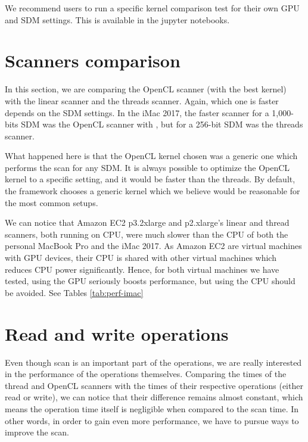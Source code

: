 We recommend users to run a specific kernel comparison test for their own GPU and SDM settings.  This is available in the jupyter notebooks.


\section{Scanners comparison}

In this section, we are comparing the OpenCL scanner (with the best kernel) with the linear scanner and the threads scanner. Again, which one is faster depends on the SDM settings. In the iMac 2017, the faster scanner for a 1,000-bits SDM was the OpenCL scanner with , but for a 256-bit SDM was the threads scanner.

What happened here is that the OpenCL kernel chosen was a generic one which performs the scan for any SDM. It is always possible to optimize the OpenCL kernel to a specific setting, and it would be faster than the threads. By default, the framework chooses a generic kernel which we believe would be reasonable for the most common setups.

We can notice that Amazon EC2 p3.2xlarge and p2.xlarge's linear and thread scanners, both running on CPU, were much slower than the CPU of both the personal MacBook Pro and the iMac 2017. As Amazon EC2 are virtual machines with GPU devices, their CPU is shared with other virtual machines which reduces CPU power significantly. Hence, for both virtual machines we have tested, using the GPU seriously boosts performance, but using the CPU should be avoided. See Tables \ref{tab:perf-imac}

\section{Read and write operations}

Even though scan is an important part of the operations, we are really interested in the performance of the operations themselves. Comparing the times of the thread and OpenCL scanners with the times of their respective operations (either read or write), we can notice that their difference remains almost constant, which means the operation time itself is negligible when compared to the scan time. In other words, in order to gain even more performance, we have to pursue ways to improve the scan.


